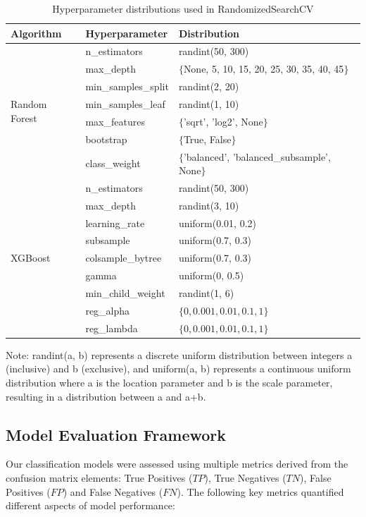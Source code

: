\begin{table}[h!]
    \centering
    \caption{Hyperparameter distributions used in RandomizedSearchCV}
    \label{tab:hyperparameter_ranges}
    \begin{tabular}{llp{5.5cm}}
    \hline
    \textbf{Algorithm} & \textbf{Hyperparameter} & \textbf{Distribution} \\
    \hline
    \multirow{7}{*}{Random Forest} & n\_estimators & randint(50, 300) \\
     & max\_depth & $\{$None, 5, 10, 15, 20, 25, 30, 35, 40, 45$\}$ \\
     & min\_samples\_split & randint(2, 20) \\
     & min\_samples\_leaf & randint(1, 10) \\
     & max\_features & $\{$'sqrt', 'log2', None$\}$ \\
     & bootstrap & $\{$True, False$\}$ \\
     & class\_weight & $\{$'balanced', 'balanced\_subsample', None$\}$ \\
    \hline
    \multirow{9}{*}{XGBoost} & n\_estimators & randint(50, 300) \\
     & max\_depth & randint(3, 10) \\
     & learning\_rate & uniform(0.01, 0.2) \\
     & subsample & uniform(0.7, 0.3) \\
     & colsample\_bytree & uniform(0.7, 0.3) \\
     & gamma & uniform(0, 0.5) \\
     & min\_child\_weight & randint(1, 6) \\
     & reg\_alpha & $\{0, 0.001, 0.01, 0.1, 1\}$ \\
     & reg\_lambda & $\{0, 0.001, 0.01, 0.1, 1\}$ \\
    \hline
    \end{tabular}
\end{table}
    
Note: randint(a, b) represents a discrete uniform distribution between integers a (inclusive) and b (exclusive), and uniform(a, b) represents a continuous uniform distribution where a is the location parameter and b is the scale parameter, resulting in a distribution between a and a+b.
\subsection{Model Evaluation Framework}

Our classification models were assessed using multiple metrics derived from the confusion matrix elements: True Positives ($TP$), True Negatives ($TN$), False Positives ($FP$) and False Negatives ($FN$). The following key metrics quantified different aspects of model performance:

